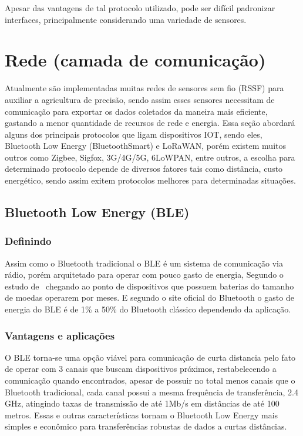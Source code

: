 \documentclass[
article,			%
12pt,				%
oneside,			%
a4paper,			%
english,			%
brazil,				%
sumario=tradicional
]{abntex2}
\begin{document}
Apesar das vantagens de tal protocolo utilizado, pode ser difícil padronizar interfaces\cite{4}, principalmente considerando uma variedade de sensores.

\section{Rede (camada de comunicação)}\label{Rede (camada de comunicação)}

Atualmente são implementadas muitas redes de sensores sem fio (RSSF) para auxiliar a agricultura de precisão\cite{6}, sendo assim esses sensores necessitam de comunicação para exportar os dados coletados da maneira mais eficiente, gastando a menor quantidade de recursos de rede e energia\cite{5}. Essa seção abordará alguns dos principais protocolos que ligam dispositivos IOT, sendo eles\cite{5}, Bluetooth Low Energy (BluetoothSmart) e LoRaWAN\texttrademark, porém existem muitos outros como Zigbee, Sigfox, 3G/4G/5G, 6LoWPAN, entre outros, a escolha para determinado protocolo depende de diversos fatores tais como distância, custo energético, sendo assim exitem protocolos melhores para determinadas situações\cite{7}.

\subsection{Bluetooth Low Energy (BLE)}\label{Bluetooth Low Energy (BLE)}
\subsubsection{Definindo}\label{Definindo}
Assim como o Bluetooth tradicional o BLE é um sistema de comunicação via rádio, porém arquitetado para operar com pouco gasto de energia\cite{siteBluetooth}, Segundo o estudo de~\citeauthor{ble} chegando ao ponto de dispositivos que possuem baterias do tamanho de moedas operarem por meses. E segundo o site oficial do Bluetooth\cite{siteBluetooth} o gasto de energia do BLE é de 1\% a 50\% do Bluetooth clássico dependendo da aplicação.

\subsubsection{Vantagens e aplicações}\label{Vantagens e aplicações}
O BLE torna-se uma opção viável para comunicação de curta distancia pelo fato de operar com 3 canais\cite{ble} que buscam dispositivos próximos, restabelecendo a comunicação quando encontrados, apesar de possuir no total menos canais que o Bluetooth tradicional, cada canal possui a mesma frequência de transferência, 2.4 GHz, atingindo taxas de transmissão de até 1Mb/s\cite{5} em distâncias de até 100 metros\cite{5}. Essas e outras características tornam o Bluetooth Low Energy mais simples e econômico para transferências robustas de dados a curtas distâncias\cite{ble}.
\end{document}
